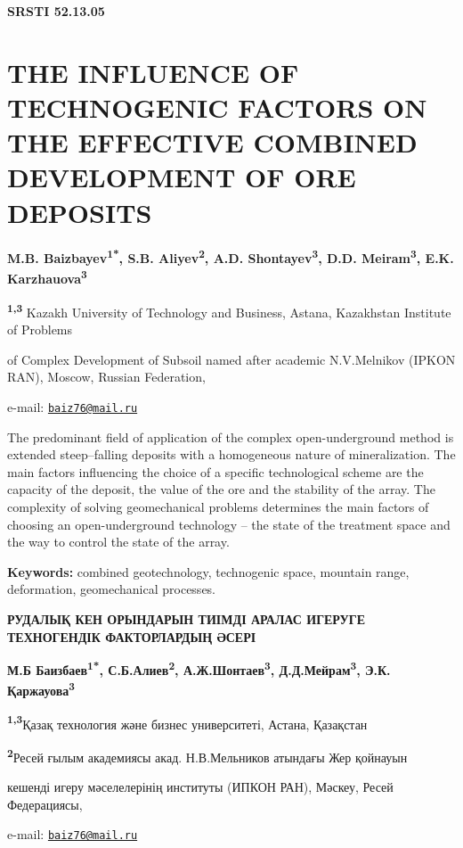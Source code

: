 \clearpage
{\bfseries SRSTI 52.13.05}

\section{THE INFLUENCE OF TECHNOGENIC FACTORS ON THE EFFECTIVE COMBINED DEVELOPMENT OF ORE DEPOSITS}

\begin{center}
{\bfseries M.B. Baizbayev\textsuperscript{1*}, S.B.
Aliyev\textsuperscript{2}, A.D. Shontayev\textsuperscript{3}, D.D.
Meiram\textsuperscript{3}, E.K. Karzhauova\textsuperscript{3}}

{\bfseries \textsuperscript{1,3}} Kazakh University of Technology and
Business, Astana, Kazakhstan Institute of Problems

of Complex Development of Subsoil named after academic N.V.Melnikov
(IPKON RAN), Moscow, Russian Federation,

e-mail: \href{mailto:baiz76@mail.ru}{\nolinkurl{baiz76@mail.ru}}
\end{center}

The predominant field of application of the complex open-underground
method is extended steep--falling deposits with a homogeneous nature of
mineralization. The main factors influencing the choice of a specific
technological scheme are the capacity of the deposit, the value of the
ore and the stability of the array. The complexity of solving
geomechanical problems determines the main factors of choosing an
open-underground technology -- the state of the treatment space and the
way to control the state of the array.

{\bfseries Keywords:} combined geotechnology, technogenic space, mountain
range, deformation, geomechanical processes.

\begin{center}
{\large\bfseries РУДАЛЫҚ КЕН ОРЫНДАРЫН ТИІМДІ АРАЛАС ИГЕРУГЕ ТЕХНОГЕНДІК ФАКТОРЛАРДЫҢ ӘСЕРІ}

{\bfseries М.Б Баизбаев\textsuperscript{1*}, С.Б.Алиев\textsuperscript{2},
А.Ж.Шонтаев\textsuperscript{3}, Д.Д.Мейрам\textsuperscript{3}, Э.К.
Қаржауова\textsuperscript{3}}

{\bfseries \textsuperscript{1,3}}Қазақ технология және бизнес университеті,
Астана, Қазақстан

{\bfseries \textsuperscript{2}}Ресей ғылым академиясы акад. Н.В.Мельников
атындағы Жер қойнауын

кешенді игеру мәселелерінің институты (ИПКОН РАН), Мәскеу, Ресей
Федерациясы,

e-mail: \href{mailto:baiz76@mail.ru}{\nolinkurl{baiz76@mail.ru}}
\end{center}

